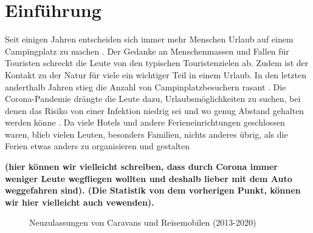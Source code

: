 \section{Einführung}


Seit einigen Jahren entscheiden sich immer mehr Menschen Urlaub auf einem Campingplatz zu machen \cite{periodical:ANST}.
Der Gedanke an Menschenmassen und Fallen für Touristen schreckt die Leute von den typischen Touristenzielen ab. 
Zudem ist der Kontakt zu der Natur für viele ein wichtiger Teil in einem Urlaub. In den letzten anderthalb 
Jahren stieg die Anzahl von Campinplatzbesuchern rasant \cite{periodical:UBST}. Die Corona-Pandemie drängte die Leute dazu, 
Urlaubsmöglichkeiten zu suchen, bei denen das Risiko von einer Infektion niedrig sei und wo genug Abstand gehalten 
werden könne \cite{periodical:AUST}. Da viele Hotels und andere Ferieneinrichtungen geschlossen waren, blieb 
vielen Leuten, besonders Familien, nichts anderes übrig, als die Ferien etwas anders zu organisieren und gestalten 

\textbf{(hier können wir vielleicht schreiben, dass durch Corona immer weniger Leute wegfliegen wollten und deshalb lieber
mit dem Auto weggefahren sind). (Die Statistik von dem vorherigen Punkt, können wir hier vielleicht auch vewenden).}

\vfill
\begin{figure}[H]
    \caption{Neuzulassungen von Caravans und Reisemobilen (2013-2020) \cite{periodical:UBST}}
    \label{fig:periodical_ANST}
\end{figure}
\vfill

